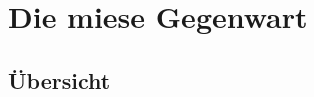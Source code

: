 \section{Die miese Gegenwart}

\subsection{Übersicht}


\def\zugartText#1#2{%
	#1 - #2
}

\def\rowset{1ex}
\def\colset{2.2em}

\def\jezus#1{%
	\tiny\only<#1>{\color{red}\scriptsize}
}

\def\lowlife#1{
	\begin{figure}
		\begin{subfigure}{0.48\textwidth}
			\texttt{[image: gegenwart/\#1-1]}
		\end{subfigure}
		\hfill
		\begin{subfigure}{0.48\textwidth}
			\texttt{[image: gegenwart/\#1-2]}
		\end{subfigure}
	\end{figure}
}

